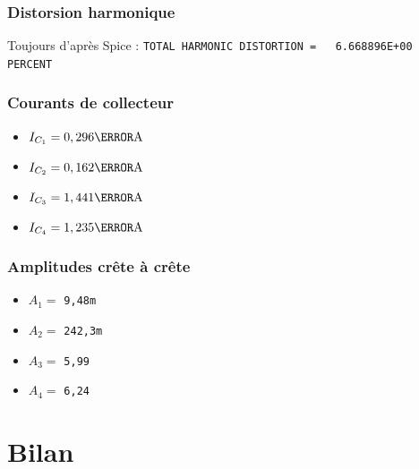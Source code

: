 \documentclass[11pt;a4paper]{report}
\begin{document}
   \subsection{Distorsion harmonique}
    Toujours d'après Spice : \verb|TOTAL HARMONIC DISTORTION =   6.668896E+00 PERCENT|

   \subsection{Courants de collecteur}
    \begin{itemize}
     \item $I_{C_1} = 0,296 \milli\ampere$
     \item $I_{C_2} = 0,162 \milli\ampere$
     \item $I_{C_3} = 1,441 \milli\ampere$
     \item $I_{C_4} = 1,235 \milli\ampere$
    \end{itemize}

   \subsection{Amplitudes crête à crête}
    \begin{itemize}
     \item $A_1 =$ \verb|9,48m| \volt
     \item $A_2 =$ \verb|242,3m| \volt
     \item $A_3 =$ \verb|5,99| \volt
     \item $A_4 =$ \verb|6,24| \volt
    \end{itemize}

 \chapter{Bilan}
\end{document}
